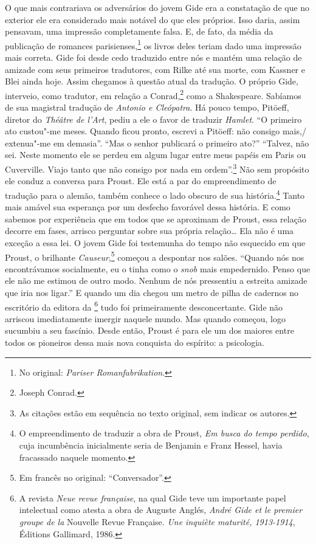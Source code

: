 O que mais contrariava os adversários do jovem Gide era a constatação de
que no exterior ele era considerado mais notável do que eles próprios.
Isso daria, assim pensavam, uma impressão completamente falsa. E, de
fato, da média da publicação de romances parisienses,\footnote{No
  original: \emph{Pariser Romanfabrikation}. \versal{[N. T.]}} os livros deles teriam dado uma impressão mais correta. Gide foi
desde cedo traduzido entre nós e mantém uma relação de amizade com seus
primeiros tradutores, com Rilke até sua morte, com Kassner e Blei ainda
hoje. Assim chegamos à questão atual da tradução. O próprio Gide,
interveio, como tradutor, em relação a Conrad,\footnote{Joseph
  Conrad. \versal{[N. E.]}} como a Shakespeare. Sabíamos de sua magistral tradução de
\emph{Antonio e Cleópatra}. Há pouco tempo, Pitöeff, diretor do
\emph{Théâtre de l'Art}, pediu a ele o favor de traduzir \emph{Hamlet}.
``O primeiro ato custou"-me meses. Quando ficou pronto, escrevi a
Pitöeff: não consigo mais,/ extenua"-me em demasia''. ``Mas o senhor
publicará o primeiro ato?'' ``Talvez, não sei. Neste momento ele se
perdeu em algum lugar entre meus papéis em Paris ou Cuverville. Viajo
tanto que não consigo por nada em ordem''.\footnote{As citações
  estão em sequência no texto original, sem indicar os autores. \versal{[N. T.]}} Não sem propósito ele conduz a conversa para Proust. Ele está a
par do empreendimento de tradução para o alemão, também conhece o lado
obscuro de sua história.\footnote{O empreendimento de traduzir a
  obra de Proust, \emph{Em busca do tempo perdido}, cuja incumbência
  inicialmente seria de Benjamin e Franz Hessel, havia fracassado
  naquele momento. \versal{[N. T.]}} Tanto mais amável sua esperança por um desfecho
favorável dessa história. E como sabemos por experiência que em todos
que se aproximam de Proust, essa relação decorre em fases, arrisco
perguntar sobre sua própria relação\ldots{} Ela não é uma exceção a essa lei.
O jovem Gide foi testemunha do tempo não esquecido em que Proust, o
brilhante \emph{Causeur},\footnote{Em francês no original: ``Conversador''. \versal{[N. T.]}} começou
a despontar nos salões. ``Quando nós nos encontrávamos socialmente, eu o
tinha como o \emph{snob} mais empedernido. Penso que ele não me
estimou de outro modo. Nenhum de nós pressentiu a estreita amizade que
iria nos ligar.'' E quando um dia chegou um metro de pilha de cadernos
no escritório da editora da \footnote{A revista
  \emph{Neue revue française}, na qual Gide teve um importante papel
  intelectual como atesta a obra de Auguste Anglés, \emph{André Gide et
  le premier groupe de la} Nouvelle Revue Française. \emph{Une inquiète
  maturité, 1913-1914}, Éditions Gallimard, 1986. \versal{[N. T.]}} tudo foi
primeiramente desconcertante. Gide não arriscou imediatamente imergir
naquele mundo. Mas quando começou, logo sucumbiu a seu fascínio. Desde
então, Proust é para ele um dos maiores entre todos os pioneiros dessa
mais nova conquista do espírito: a psicologia.

